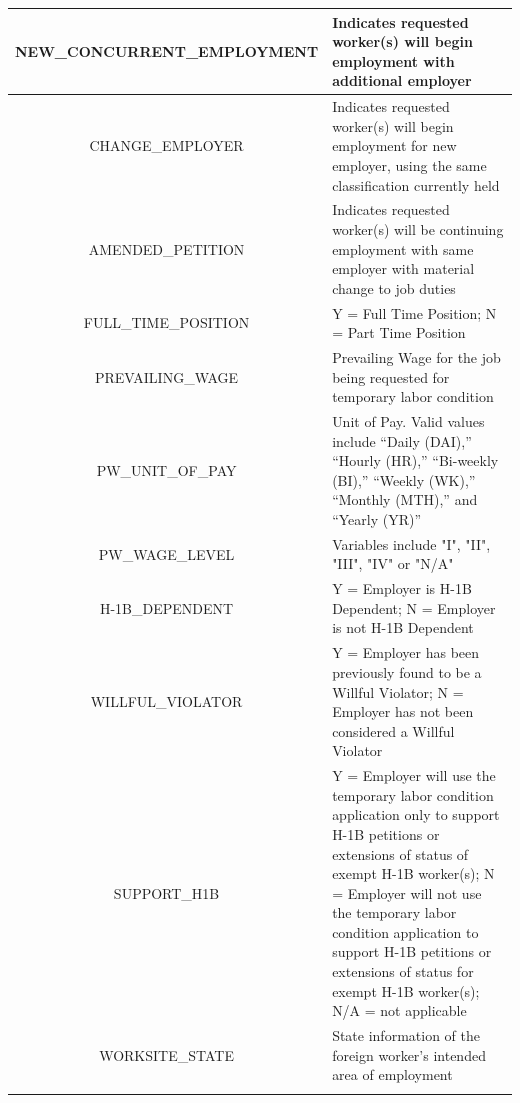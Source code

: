 \begin{appendices}
\begin{table}[h]
\begin{tabularx}{\textwidth}{|c|X|}
NEW\_CONCURRENT\_EMPLOYMENT & Indicates requested worker(s) will begin employment with additional employer\\\hline
CHANGE\_EMPLOYER & Indicates requested worker(s) will begin employment for new employer, using the same classification currently held\\\hline
AMENDED\_PETITION & Indicates requested worker(s) will be continuing employment with same employer with material change to job duties\\\hline
FULL\_TIME\_POSITION & Y = Full Time Position; N = Part Time Position\\\hline
PREVAILING\_WAGE & Prevailing Wage for the job being requested for temporary labor condition\\\hline
PW\_UNIT\_OF\_PAY & Unit of Pay. Valid values include “Daily (DAI),” “Hourly (HR),” “Bi-weekly (BI),” “Weekly (WK),” “Monthly (MTH),” and “Yearly (YR)”\\\hline
PW\_WAGE\_LEVEL & Variables include "I", "II", "III", "IV" or "N/A"\\\hline
H-1B\_DEPENDENT & Y = Employer is H-1B Dependent; N = Employer is not H-1B Dependent\\\hline
WILLFUL\_VIOLATOR & Y = Employer has been previously found to be a Willful Violator; N = Employer has not been considered a Willful Violator\\\hline
SUPPORT\_H1B & Y = Employer will use the temporary labor condition application only to support H-1B petitions or extensions of status of exempt H-1B worker(s); N = Employer will not use the temporary labor condition application to support H-1B petitions or extensions of status for exempt H-1B worker(s); N/A = not applicable\\\hline
WORKSITE\_STATE & State information of the foreign worker's intended area of employment\\
\noalign{\smallskip}\hline
\end{tabularx}
\end{table}

\end{appendices}



